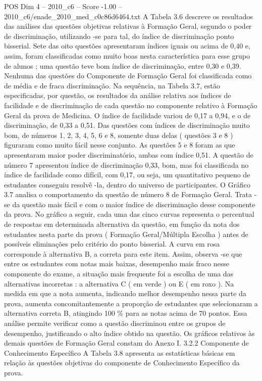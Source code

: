 \begin{textsample}{POS Dim 4 – 2010\_c6 – Score -1.00 – 2010\_c6/enade\_2010\_med\_c0c86d6464.txt}
A Tabela 3.6 descreve os resultados das análises das questões objetivas relativas à Formação Geral, segundo o poder de discriminação, utilizando -se para tal, do índice de discriminação ponto bisserial.
Sete das oito questões apresentaram índices iguais ou acima de 0,40 e, assim, foram classificadas como muito boas nesta característica para esse grupo de alunos ; uma questão teve bom índice de discriminação, entre 0,30 e 0,39.
Nenhuma das questões do Componente de Formação Geral foi classificada como de média e de fraca discriminação.
Na sequência, na Tabela 3.7, estão especificadas, por questão, os resultados da análise relativa aos índices de facilidade e de discriminação de cada questão no componente relativo à Formação Geral da prova de Medicina.
O índice de facilidade variou de 0,17 a 0,94, e o de discriminação, de 0,33 a 0,51.
Das questões com índices de discriminação muito bom, de números 1, 2, 3, 4, 5, 6 e 8, somente duas delas ( questões 3 e 8 ) figuraram como muito fácil nesse conjunto.
As questões 5 e 8 foram as que apresentaram maior poder discriminatório, ambas com índice 0,51.
A questão de número 7 apresentou índice de discriminação 0,33, bom, mas foi classificada no índice de facilidade como difícil, com 0,17, ou seja, um quantitativo pequeno de estudantes conseguiu resolvê -la, dentro do universo de participantes.
O Gráfico 3.7 analisa o comportamento da questão de número 8 de Formação Geral.
Trata -se da questão mais fácil e com o maior índice de discriminação desse componente da prova.
No gráfico a seguir, cada uma das cinco curvas representa o percentual de respostas em determinada alternativa da questão, em função da nota dos estudantes nesta parte da prova ( Formação Geral/Múltipla Escolha ) antes de possíveis eliminações pelo critério do ponto bisserial.
A curva em rosa corresponde à alternativa B, a correta para este item.
Assim, observa -se que entre os estudantes com notas mais baixas, desempenho mais fraco nesse componente do exame, a situação mais frequente foi a escolha de uma das alternativas incorretas : a alternativa C ( em verde ) ou E ( em roxo ).
Na medida em que a nota aumenta, indicando melhor desempenho nessa parte da prova, aumenta concomitantemente a proporção de estudantes que selecionaram a alternativa correta B, atingindo 100 \% para as notas acima de 70 pontos.
Essa análise permite verificar como a questão discriminou entre os grupos de desempenho, justificando o alto índice obtido na questão.
Os gráficos relativos às demais questões de Formação Geral constam do Anexo I. 3.2.2 Componente de Conhecimento Específico A Tabela 3.8 apresenta as estatísticas básicas em relação às questões objetivas do componente de Conhecimento Específico da prova.

\end{textsample}
